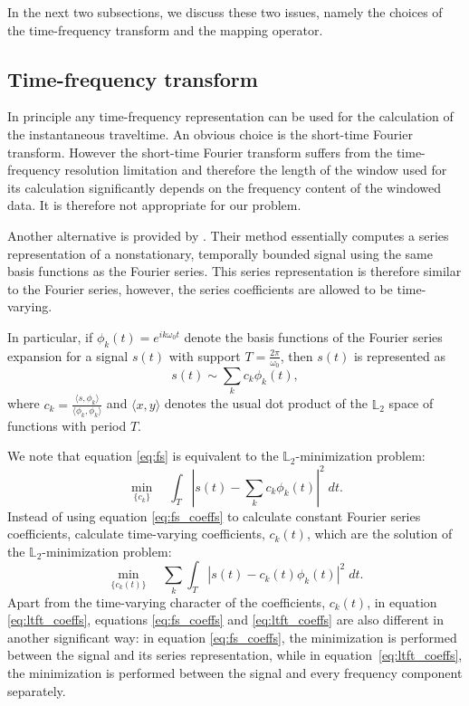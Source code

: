 In the next two subsections, we discuss these two issues, namely the choices of the time-frequency transform and the mapping operator.

\subsection{Time-frequency transform}
In principle any time-frequency representation can be used for the calculation of the instantaneous traveltime. An obvious choice is the short-time Fourier transform. However the short-time Fourier transform suffers from the time-frequency resolution limitation and therefore the length of the window used for its calculation significantly depends on the frequency content of the windowed data. It is therefore not appropriate for our problem.  

Another alternative is provided by \cite{liu11time-freq}. Their method essentially computes a series representation of a nonstationary, temporally bounded signal using the same basis functions as the Fourier series. 
This series representation is therefore similar to the Fourier series, however, the series coefficients are allowed to be time-varying.

In particular, if $\phi_k(t)=e^{ik\omega_0 t}$ denote the basis functions of the Fourier series expansion for a signal $s(t)$ with support $T=\frac{2\pi}{\omega_0}$, then $s(t)$ is represented as 
\begin{equation}\label{eq:fs} 
   s(t)\sim \sum_k c_k\phi_k(t), 
\end{equation}
where $c_k = \frac{\langle s,\phi_k\rangle}{\langle \phi_k,\phi_k\rangle}$ and $\langle x, y\rangle$ denotes the usual dot product of the $\mathds L_2$ space of functions with period $T$. 

We note that equation \ref{eq:fs} is equivalent to the $\mathds L_2$-minimization problem: 
\begin{equation}
   \min_{\{c_k\}}\quad\int_T|s(t)-\sum_kc_k\phi_k(t)|^2\;dt.\label{eq:fs_coeffs}
\end{equation}
Instead of using equation \ref{eq:fs_coeffs} to calculate constant Fourier series coefficients, \citet{liu11time-freq} calculate time-varying coefficients, $c_k(t)$, which are the solution of the $\mathds L_2$-minimization problem: 
\begin{equation}
   \min_{\{c_k(t)\}}\quad\sum_k\int_T|s(t)-c_k(t)\phi_k(t)|^2\;dt.\label{eq:ltft_coeffs}
\end{equation}
Apart from the time-varying character of the coefficients, $c_k(t)$, in equation \ref{eq:ltft_coeffs}, equations \ref{eq:fs_coeffs} and \ref{eq:ltft_coeffs} are also different in another significant way: in equation \ref{eq:fs_coeffs}, the minimization is performed between the signal and its series representation, while in equation~\ref{eq:ltft_coeffs}, the minimization is performed between the signal and every frequency component separately.  

